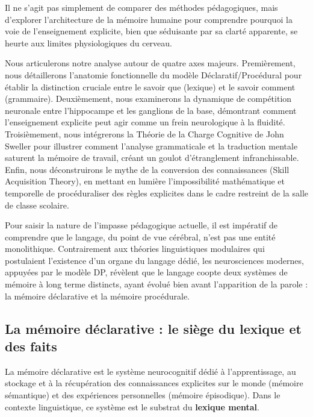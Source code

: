 Il ne s'agit pas simplement de comparer
des méthodes pédagogiques, mais d'explorer l'architecture de la mémoire humaine pour comprendre
pourquoi la voie de l'enseignement explicite, bien que séduisante par sa clarté apparente, se heurte
aux limites physiologiques du cerveau.

Nous articulerons notre analyse autour de quatre axes majeurs. Premièrement, nous détaillerons
l'anatomie fonctionnelle du modèle Déclaratif/Procédural pour établir la distinction cruciale entre
le \og savoir que\fg{} (lexique) et le \og savoir comment\fg{} (grammaire). Deuxièmement, nous
examinerons la dynamique de compétition neuronale entre l'hippocampe et les ganglions de la base,
démontrant comment l'enseignement explicite peut agir comme un frein neurologique à la fluidité.
Troisièmement, nous intégrerons la Théorie de la Charge Cognitive de John Sweller pour illustrer
comment l'analyse grammaticale et la traduction mentale saturent la mémoire de travail, créant un
goulot d'étranglement infranchissable. Enfin, nous déconstruirons le mythe de la \og conversion\fg{}
des connaissances (Skill Acquisition Theory), en mettant en lumière l'impossibilité mathématique et
temporelle de procéduraliser des règles explicites dans le cadre restreint de la salle de classe
scolaire.

Pour saisir la nature de l'impasse pédagogique actuelle, il est impératif de comprendre que le
langage, du point de vue cérébral, n'est pas une entité monolithique. Contrairement aux théories
linguistiques modulaires qui postulaient l'existence d'un \og organe du langage\fg{} dédié, les
neurosciences modernes, appuyées par le modèle DP, révèlent que le langage \og coopte\fg{} deux
systèmes de mémoire à long terme distincts, ayant évolué bien avant l'apparition de la parole : la
mémoire déclarative et la mémoire procédurale.



\subsection{La mémoire déclarative : le siège du lexique et des faits}

La mémoire déclarative est le système neurocognitif dédié à l'apprentissage, au stockage et à la
récupération des connaissances explicites sur le monde (mémoire sémantique) et des expériences
personnelles (mémoire épisodique). Dans le contexte linguistique, ce système est le substrat du
\textbf{lexique mental}.




